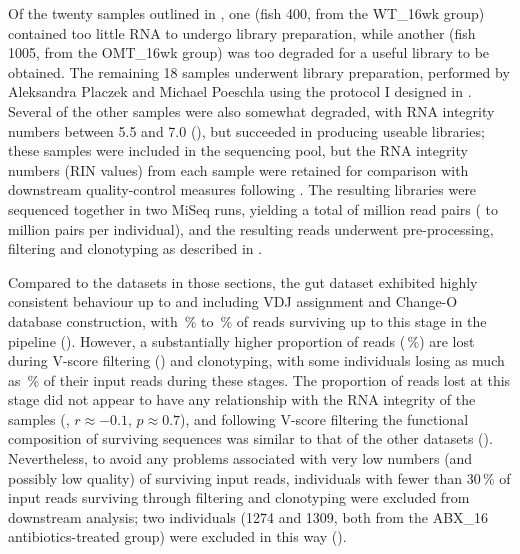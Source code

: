 Of the twenty samples outlined in , one (fish 400, from the WT\_16wk group) contained too little RNA to undergo \igseq library preparation, while another (fish 1005, from the OMT\_16wk group) was too degraded for a useful library to be obtained. The remaining 18 samples underwent \igseq library preparation, performed by Aleksandra Placzek and Michael Poeschla using the protocol I designed in . Several of the other samples were also somewhat degraded, with RNA integrity numbers between 5.5 and 7.0 (), but succeeded in producing useable libraries; these samples were included in the sequencing pool, but the RNA integrity numbers (RIN values) from each sample were retained for comparison with downstream quality-control measures following \Igseq. The resulting libraries were sequenced together in two MiSeq runs, yielding a total of  million read pairs ( to  million pairs per individual), and the resulting reads underwent pre-processing, filtering and clonotyping as described in .

Compared to the datasets in those sections, the gut dataset exhibited highly consistent behaviour up to and including VDJ assignment and Change-O database construction, with \,\% to \,\% of reads surviving up to this stage in the pipeline (). However, a substantially higher proportion of reads (\,\%) are lost during V-score filtering () and clonotyping, with some individuals losing as much as \,\% of their input reads during these stages. The proportion of reads lost at this stage did not appear to have any relationship with the RNA integrity of the samples (, $r \approx -0.1$, $p \approx 0.7$), and following V-score filtering the functional composition of surviving sequences was similar to that of the other datasets (). Nevertheless, to avoid any problems associated with very low numbers (and possibly low quality) of surviving input reads, individuals with fewer than 30\,\% of input reads surviving through filtering and clonotyping were excluded from downstream analysis; two individuals (1274 and 1309, both from the ABX\_16 antibiotics-treated group) were excluded in this way ().

